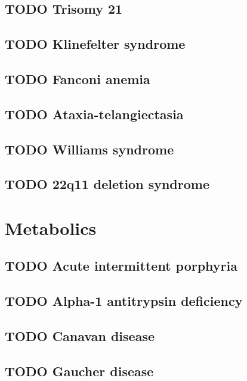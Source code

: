 \documentclass{scrartcl}
\begin{document}
\subsection{{\bfseries\sffamily TODO} Trisomy 21}
\label{sec:orgfe8fb63}
\subsection{{\bfseries\sffamily TODO} Klinefelter syndrome}
\label{sec:org10b49cf}
\subsection{{\bfseries\sffamily TODO} Fanconi anemia}
\label{sec:orgff6d3cb}
\subsection{{\bfseries\sffamily TODO} Ataxia-telangiectasia}
\label{sec:org9603b39}
\subsection{{\bfseries\sffamily TODO} Williams syndrome}
\label{sec:orgbcc3e66}
\subsection{{\bfseries\sffamily TODO} 22q11 deletion syndrome}
\label{sec:org5873571}

\section{Metabolics}
\label{sec:org65b425c}
\subsection{{\bfseries\sffamily TODO} Acute intermittent porphyria}
\label{sec:orgda09102}
\subsection{{\bfseries\sffamily TODO} Alpha-1 antitrypsin deficiency}
\label{sec:orge92e082}
\subsection{{\bfseries\sffamily TODO} Canavan disease}
\label{sec:org488c94f}
\subsection{{\bfseries\sffamily TODO} Gaucher disease}
\label{sec:org16a9eec}
\end{document}
